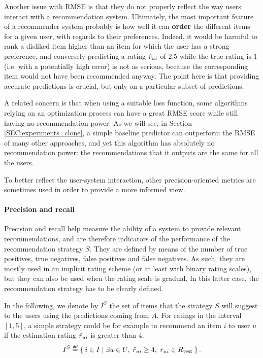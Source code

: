 Another issue with RMSE is that they do not properly reflect the way users
interact with a recommendation system.  Ultimately, the most important feature
of a recommender system probably is how well it can \textbf{order} the
different items for a given user, with regards to their preferences. Indeed, it
would be harmful to rank a disliked item higher than an item for which the user
has a strong preference, and conversely predicting a rating $\hat{r}_{ui}$ of $2.5$
while the true rating is $1$ (i.e. with a potentially high error) is not as
serious, because the corresponding item would not have been recommended anyway.
The point here is that providing accurate predictions is crucial, but only on a
particular subset of predictions.

A related concern is that when using a suitable loss function, some algorithms
relying on an optimization process
can have a great RMSE score while still having no recommendation power.
As we will see, in Section \ref{SEC:experiments_clone}, a simple baseline
predictor  can outperform the RMSE of many other approaches, and yet this
algorithm has absolutely no recommendation power: the recommendations that it
outputs are the same for all the users.

To better reflect the user-system interaction, other precision-oriented metrics
are sometimes used in order to provide a more informed view.

\paragraph{Precision and recall\\}
Precision and recall help measure the ability of a system to provide relevant
recommendations, and are therefore indicators of the performance of the
recommendation strategy $S$. They are defined by means of the number of true
positives, true negatives, false positives and false negatives. As such, they
are mostly used in an implicit rating scheme (or at least with binary rating
scales), but they can also be used when the rating scale is gradual. In this
latter case, the recommendation strategy has to be clearly defined.

In the following, we denote by $I^S$ the set of items that the strategy $S$
will suggest to the users using the predictions coming from $A$. For
ratings in the interval $[1, 5]$, a simple strategy could be for example to
recommend an item $i$ to user $u$ if the estimation rating $\hat{r}_{ui}$ is
greater than $4$:
$$I^S \eqdef \Set{i \in I | \exists u \in U, ~\predrui \geq 4,~ \rui \in \Rtest}.$$

